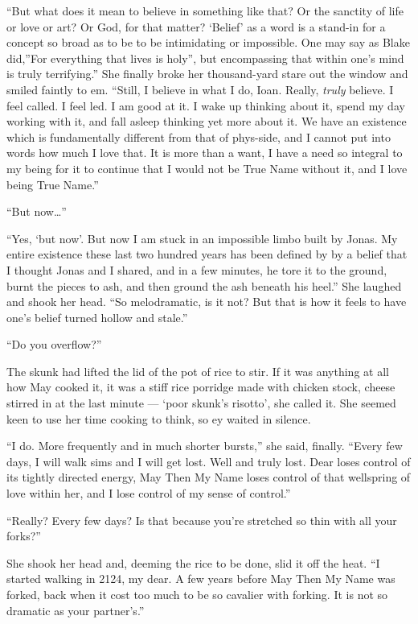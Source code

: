 ``But what does it mean to believe in something like that? Or the sanctity of life or love or art? Or God, for that matter? `Belief' as a word is a stand-in for a concept so broad as to be to be intimidating or impossible. One may say as Blake did,''For everything that lives is holy'', but encompassing that within one's mind is truly terrifying.'' She finally broke her thousand-yard stare out the window and smiled faintly to em. ``Still, I believe in what I do, Ioan. Really, \emph{truly} believe. I feel called. I feel led. I am good at it. I wake up thinking about it, spend my day working with it, and fall asleep thinking yet more about it. We have an existence which is fundamentally different from that of phys-side, and I cannot put into words how much I love that. It is more than a want, I have a need so integral to my being for it to continue that I would not be True Name without it, and I love being True Name.''

``But now\ldots{}''

``Yes, `but now'. But now I am stuck in an impossible limbo built by Jonas. My entire existence these last two hundred years has been defined by by a belief that I thought Jonas and I shared, and in a few minutes, he tore it to the ground, burnt the pieces to ash, and then ground the ash beneath his heel.'' She laughed and shook her head. ``So melodramatic, is it not? But that is how it feels to have one's belief turned hollow and stale.''

``Do you overflow?''

The skunk had lifted the lid of the pot of rice to stir. If it was anything at all how May cooked it, it was a stiff rice porridge made with chicken stock, cheese stirred in at the last minute — `poor skunk's risotto', she called it. She seemed keen to use her time cooking to think, so ey waited in silence.

``I do. More frequently and in much shorter bursts,'' she said, finally. ``Every few days, I will walk sims and I will get lost. Well and truly lost. Dear loses control of its tightly directed energy, May Then My Name loses control of that wellspring of love within her, and I lose control of my sense of control.''

``Really? Every few days? Is that because you're stretched so thin with all your forks?''

She shook her head and, deeming the rice to be done, slid it off the heat. ``I started walking in 2124, my dear. A few years before May Then My Name was forked, back when it cost too much to be so cavalier with forking. It is not so dramatic as your partner's.''

